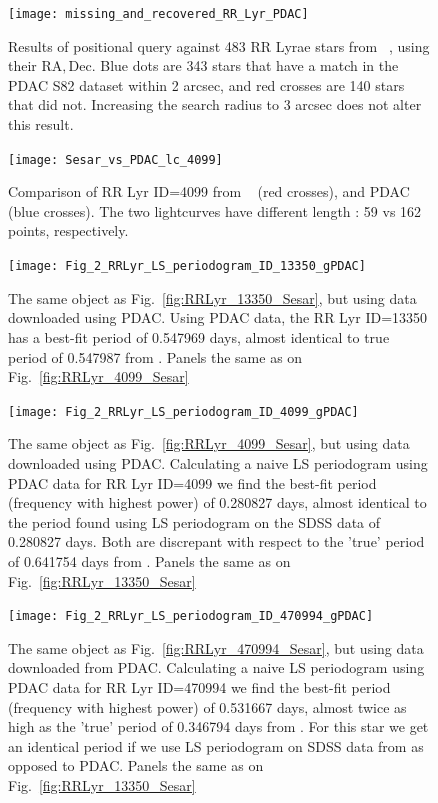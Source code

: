\documentclass[fleqn,usenatbib]{mnras} %
\begin{document}
\begin{figure}
\texttt{[image: missing\_and\_recovered\_RR\_Lyr\_PDAC]}
\caption{Results of positional query against 483 RR Lyrae stars from ~\citep{sesar2010}, using their $\mathrm{RA}, \mathrm{Dec}$. Blue dots are 343 stars that have a match in the PDAC S82 dataset within 2 arcsec, and red crosses are 140 stars that did not. Increasing the search radius to 3 arcsec does not alter this result. }
\label{fig:PDAC_query_ra_dec}
\end{figure}

\begin{figure}
\texttt{[image: Sesar\_vs\_PDAC\_lc\_4099]}
\caption{Comparison of RR Lyr ID=4099  from  ~\citep{sesar2010}  (red crosses), and PDAC (blue crosses).  The two lightcurves have different length : 59 vs 162 points, respectively.}
\label{fig:PDAC_SDSS_compare_LC}
\end{figure}




\begin{figure}
\texttt{[image: Fig\_2\_RRLyr\_LS\_periodogram\_ID\_13350\_gPDAC]}
\caption{ The same object as Fig.~\ref{fig:RRLyr_13350_Sesar}, but using data downloaded using PDAC. Using PDAC data, the RR Lyr ID=13350 has a best-fit period of 0.547969 days, almost identical to true period of  0.547987 from \citep{sesar2010}. Panels the same as on Fig.~\ref{fig:RRLyr_4099_Sesar}}
\label{fig:RRLyr_13350_PDAC}
\end{figure}

\begin{figure}
\texttt{[image: Fig\_2\_RRLyr\_LS\_periodogram\_ID\_4099\_gPDAC]}
\caption{ The same object as Fig.~\ref{fig:RRLyr_4099_Sesar}, but using data downloaded using PDAC. Calculating a naive LS periodogram using PDAC data for RR Lyr ID=4099 we find the  best-fit period (frequency with highest power) of 0.280827 days, almost identical to the period found using LS  periodogram on the SDSS \citep{sesar2010} data of 0.280827 days. Both are discrepant with respect to the 'true' period of 0.641754 days from \citep{sesar2010}. Panels the same as on Fig.~\ref{fig:RRLyr_13350_Sesar}}
\label{fig:RRLyr_4099_PDAC}
\end{figure}



\begin{figure}
\texttt{[image: Fig\_2\_RRLyr\_LS\_periodogram\_ID\_470994\_gPDAC]}
\caption{ The same object as Fig.~\ref{fig:RRLyr_470994_Sesar}, but using data downloaded from PDAC. Calculating a naive LS periodogram using PDAC data for RR Lyr ID=470994 we find the  best-fit period (frequency with highest power) of 0.531667  days, almost twice as high as the 'true'  period of 0.346794 days from  \citep{sesar2010}. For this star we get an identical period if we use LS periodogram on SDSS data from \citep{sesar2010} as opposed to PDAC. Panels the same as on Fig.~\ref{fig:RRLyr_13350_Sesar}}
\label{fig:RRLyr_470994_PDAC}
\end{figure}
\end{document}
